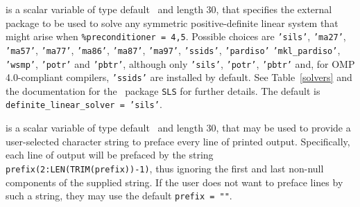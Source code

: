 \documentclass{galahad}
\begin{document}
\begin{description}
 is a scalar variable of type default \character\
and length 30, that specifies the external package to be used to
solve any symmetric positive-definite linear system that might arise
when {\tt \%precondit\-ioner = 4,5}. Possible choices are
{\tt 'sils'},
{\tt 'ma27'},
{\tt 'ma57'},
{\tt 'ma77'},
{\tt 'ma86'},
{\tt 'ma87'},
{\tt 'ma97'},
{\tt 'ssids'},
{\tt 'pardiso'}
{\tt 'mkl\_pardiso'},
{\tt 'wsmp'},
{\tt 'potr'} and
{\tt 'pbtr'},
although only {\tt 'sils'}, {\tt 'potr'}, {\tt 'pbtr'}
and, for OMP 4.0-compliant compilers,
{\tt 'ssids'} are installed by default.
See Table~\ref{solvers} and
the documentation for the \galahad\ package {\tt SLS} for further details.
The default is {\tt definite\_linear\_solver = 'sils'}.

 is a scalar variable of type default \character\
and length 30, that may be used to provide a user-selected
character string to preface every line of printed output.
Specifically, each line of output will be prefaced by the string
{\tt prefix(2:LEN(TRIM(prefix))-1)},
thus ignoring the first and last non-null components of the
supplied string. If the user does not want to preface lines by such
a string, they may use the default {\tt prefix = ""}.

\end{description}

\end{document}
